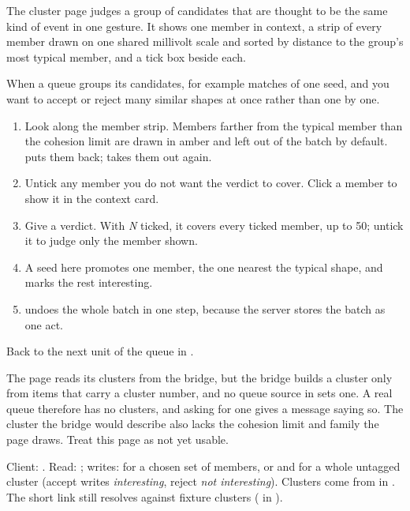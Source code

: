 The cluster page judges a group of candidates that are thought to be the same kind of event
in one gesture. It shows one member in context, a strip of every member drawn on one shared
millivolt scale and sorted by distance to the group's most typical member, and a tick box
beside each.

When a queue groups its candidates, for example matches of one seed, and you want to accept
or reject many similar shapes at once rather than one by one.


\begin{enumerate}
  \item Look along the member strip. Members farther from the typical member than the
    cohesion limit are drawn in amber and left out of the batch by default. 
    puts them back;  takes them out again.
  \item Untick any member you do not want the verdict to cover. Click a member to show it in
    the context card.
  \item Give a verdict. With  \emph{N}  ticked, it
    covers every ticked member, up to 50; untick it to judge only the member shown.
  \item A seed here promotes one member, the one nearest the typical shape, and marks the
    rest interesting.
  \item {} undoes the whole batch in one step, because the server stores the batch
    as one act.
\end{enumerate}

Back to the next unit of the queue in .

\begin{watchout}
The page reads its clusters from the bridge, but the bridge builds a cluster only from items
that carry a cluster number, and no queue source in  sets one. A real
queue therefore has no clusters, and asking for one gives a message saying so. The cluster
the bridge would describe also lacks the cohesion limit and family the page draws. Treat this
page as not yet usable.
\end{watchout}

\begin{underthehood}[Cluster]
Client: . Read: ; writes:  for a chosen set of members,
or  and  for a whole untagged cluster (accept
writes \emph{interesting}, reject \emph{not interesting}). Clusters come from
 in . The short link 
still resolves against fixture clusters ( in ).
\end{underthehood}
